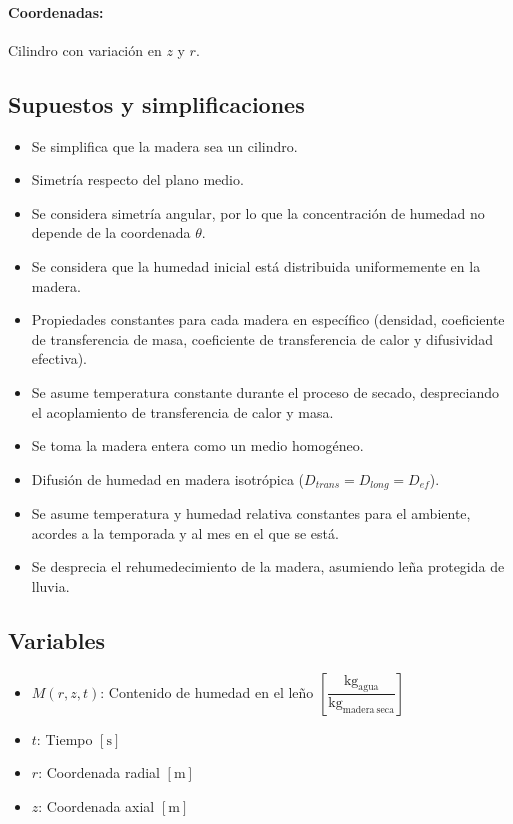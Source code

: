 \documentclass[11pt,a4paper]{article}
\begin{document}
\paragraph{Coordenadas:} Cilindro con variación en $z$ y $r$.

\subsection{Supuestos y simplificaciones}

\begin{itemize}[noitemsep]
    \item Se simplifica que la madera sea un cilindro.
    \item Simetría respecto del plano medio.
    \item Se considera simetría angular, por lo que la concentración de humedad no depende de la coordenada $\theta$.
    \item Se considera que la humedad inicial está distribuida uniformemente en la madera.
    \item Propiedades constantes para cada madera en específico (densidad, coeficiente de transferencia de masa, coeficiente de transferencia de calor y difusividad efectiva).
    \item Se asume temperatura constante durante el proceso de secado, despreciando el acoplamiento de transferencia de calor y masa.
    \item Se toma la madera entera como un medio homogéneo.
    \item Difusión de humedad en madera isotrópica ($D_{trans} = D_{long} = D_{ef}$).
    \item Se asume temperatura y humedad relativa constantes para el ambiente, acordes a la temporada y al mes en el que se está.
    \item Se desprecia el rehumedecimiento de la madera, asumiendo leña protegida de lluvia.
\end{itemize}

\subsection{Variables}

\begin{itemize}[noitemsep]
    \item $M(r,z,t)$: Contenido de humedad en el leño $\left[\dfrac{\mathrm{kg_{agua}}}{\mathrm{kg_{madera\ seca}}}\right]$
    \item $t$: Tiempo $[\mathrm{s}]$
    \item $r$: Coordenada radial $[\mathrm{m}]$
    \item $z$: Coordenada axial $[\mathrm{m}]$
\end{itemize}
\end{document}
